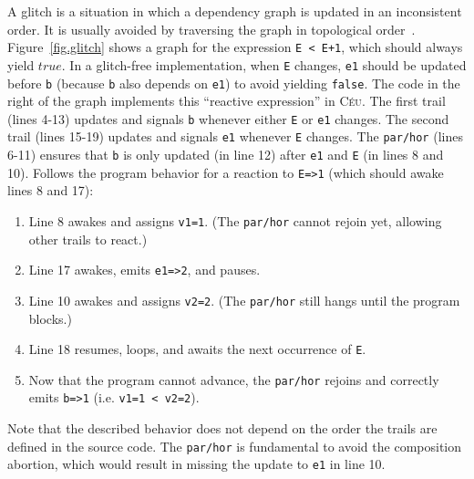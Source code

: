 \documentclass{acm_proc_article-sp}
\newcommand{\CEU}{\textsc{C\'{e}u}\xspace}
\newcommand{\code}[1] {{\small{\texttt{#1}}}}
\newcommand{\1}{\;}
\newcommand{\2}{\;\;}
\newcommand{\3}{\;\;\;}
\newcommand{\5}{\;\;\;\;\;}
\begin{document}
A glitch is a situation in which a dependency graph is updated in an 
inconsistent order.
It is usually avoided by traversing the graph in topological 
order~\cite{frtime.embedding,frp.survey}.
%
Figure~\ref{fig.glitch} shows a graph for the expression \code{E~<~E+1}, which 
should always yield $true$.
In a glitch-free implementation, when \code{E} changes, \code{e1} should be 
updated before \code{b} (because \code{b} also depends on \code{e1}) to avoid 
yielding \code{false}.
%
The code in the right of the graph implements this ``reactive expression'' in 
\CEU.
The first trail (lines 4-13) updates and signals \code{b} whenever either 
\code{E} or \code{e1} changes.
The second trail (lines 15-19) updates and signals \code{e1} whenever \code{E} 
changes.
%
The \code{par/hor} (lines 6-11) ensures that \code{b} is only updated (in line 
12) after \code{e1} and \code{E} (in lines 8 and 10).
%
Follows the program behavior for a reaction to \code{E=>1} (which should awake 
lines 8 and 17):

{\small
\begin{enumerate}
\setlength{\itemsep}{0pt}
\item Line 8 awakes and assigns \code{v1=1}.
      (The \code{par/hor} cannot rejoin yet, allowing other trails to react.)
\item Line 17 awakes, emits \code{e1=>2}, and pauses.
\item Line 10 awakes and assigns \code{v2=2}.
      (The \code{par/hor} still hangs until the program blocks.)
\item Line 18 resumes, loops, and awaits the next occurrence of \code{E}.
\item Now that the program cannot advance, the \code{par/hor} rejoins and 
        correctly emits \code{b=>1} (i.e. \code{v1=1 < v2=2}).
\end{enumerate}
}

Note that the described behavior does not depend on the order the trails are 
defined in the source code.
The \code{par/hor} is fundamental to avoid the composition abortion, which 
would result in missing the update to \code{e1} in line 10.
\end{document}
